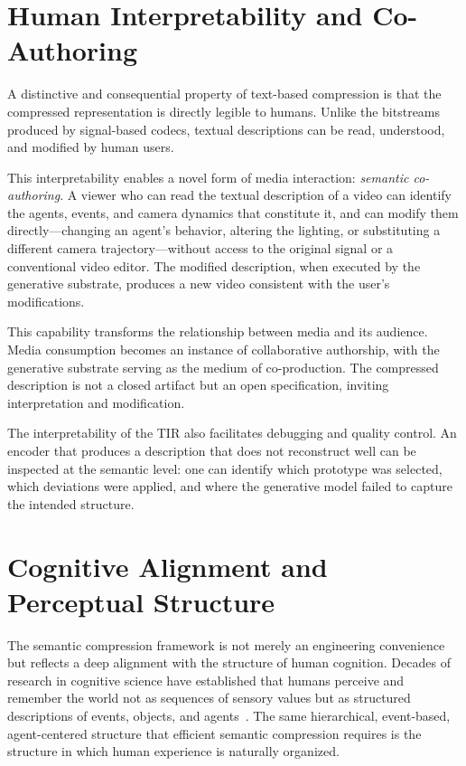\documentclass[12pt,a4paper]{article}
\theoremstyle{definition}
\theoremstyle{remark}
\begin{document}
\section{Human Interpretability and Co-Authoring}
\label{sec:human}

A distinctive and consequential property of text-based compression is that the compressed representation is directly legible to humans. Unlike the bitstreams produced by signal-based codecs, textual descriptions can be read, understood, and modified by human users.

This interpretability enables a novel form of media interaction: \emph{semantic co-authoring}. A viewer who can read the textual description of a video can identify the agents, events, and camera dynamics that constitute it, and can modify them directly---changing an agent's behavior, altering the lighting, or substituting a different camera trajectory---without access to the original signal or a conventional video editor. The modified description, when executed by the generative substrate, produces a new video consistent with the user's modifications.

This capability transforms the relationship between media and its audience. Media consumption becomes an instance of collaborative authorship, with the generative substrate serving as the medium of co-production. The compressed description is not a closed artifact but an open specification, inviting interpretation and modification.

The interpretability of the TIR also facilitates debugging and quality control. An encoder that produces a description that does not reconstruct well can be inspected at the semantic level: one can identify which prototype was selected, which deviations were applied, and where the generative model failed to capture the intended structure.

\section{Cognitive Alignment and Perceptual Structure}
\label{sec:cognitive}

The semantic compression framework is not merely an engineering convenience but reflects a deep alignment with the structure of human cognition. Decades of research in cognitive science have established that humans perceive and remember the world not as sequences of sensory values but as structured descriptions of events, objects, and agents~\cite{barwise}. The same hierarchical, event-based, agent-centered structure that efficient semantic compression requires is the structure in which human experience is naturally organized.
\end{document}
